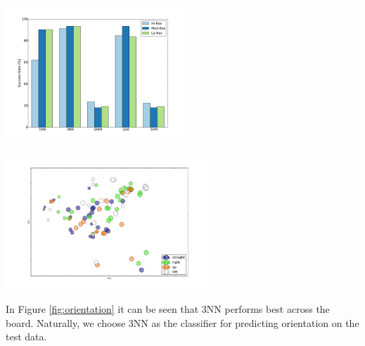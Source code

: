 \documentclass{article} %
\begin{document}
\begin{minipage}{0.45\linewidth}
	\centering
	\includegraphics[height=2in]{fig/orientation.pdf}
	\label{fig:orientation}
\end{minipage}
\hfill
\begin{minipage}{0.45\linewidth}
	\centering
	\includegraphics[height=2in]{fig/orientation_scatter.pdf}
	\label{fig:orientation_scat}
\end{minipage}

In Figure \ref{fig:orientation} it can be seen that 3NN performs best across the board.  Naturally, we choose 3NN as the classifier for predicting orientation on the test data.
\end{document}
